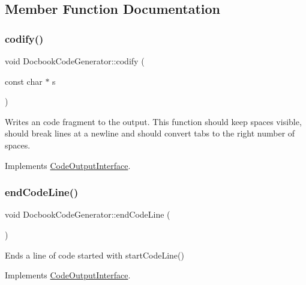 \subsection{Member Function Documentation}
\mbox{\label{class_docbook_code_generator_a7c2c177e3e6e0485e9806a75b45bd7a3}} 
\subsubsection{\texorpdfstring{codify()}{codify()}}
{\footnotesize\ttfamily void Docbook\+Code\+Generator\+::codify (\begin{DoxyParamCaption}\item[{const char $\ast$}]{s }\end{DoxyParamCaption})\hspace{0.3cm}{\ttfamily [virtual]}}

Writes an code fragment to the output. This function should keep spaces visible, should break lines at a newline and should convert tabs to the right number of spaces. 

Implements \mbox{\hyperlink{class_code_output_interface_aa29a5eedda08596ace50ed5b59c8ae7f}{Code\+Output\+Interface}}.

\mbox{\label{class_docbook_code_generator_ab457dd3ab8b99073d9d2cc6f566bb712}} 
\subsubsection{\texorpdfstring{endCodeLine()}{endCodeLine()}}
{\footnotesize\ttfamily void Docbook\+Code\+Generator\+::end\+Code\+Line (\begin{DoxyParamCaption}{ }\end{DoxyParamCaption})\hspace{0.3cm}{\ttfamily [virtual]}}

Ends a line of code started with start\+Code\+Line() 

Implements \mbox{\hyperlink{class_code_output_interface_afac5763eafc78f93b82691fb9a6dcff7}{Code\+Output\+Interface}}.

\mbox{\label{class_docbook_code_generator_a06537ef3f7d9c2cb4b9b0293f43d9151}} 
